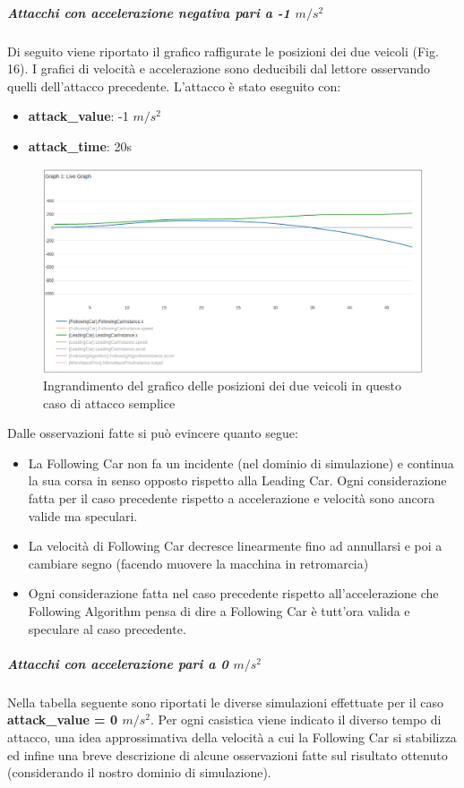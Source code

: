 \subparagraph{Attacchi con accelerazione negativa pari a -1 $m/s^2$}
Di seguito viene riportato il grafico raffigurate le posizioni dei due veicoli (Fig. 16). I grafici di velocità e accelerazione sono deducibili dal lettore osservando quelli dell'attacco precedente.
L'attacco è stato eseguito con:
\begin{itemize}
	\item \textbf{attack\_value}: -1 $m/s^2$
	\item \textbf{attack\_time}: 20s
\end{itemize}
\begin{figure}[H]
	\centering
	\includegraphics[width=\textwidth]{img/AttackAccel-1XZoomed.png}
	\caption{Ingrandimento del grafico delle posizioni dei due veicoli in questo caso di attacco semplice}
\end{figure}

Dalle osservazioni fatte si può evincere quanto segue:
\begin{itemize}
	\item La Following Car non fa un incidente (nel dominio di simulazione) e continua la sua corsa in senso opposto rispetto alla Leading Car. Ogni considerazione fatta per il caso precedente rispetto a accelerazione e velocità sono ancora valide ma speculari.
	\item La velocità di Following Car decresce linearmente fino ad annullarsi e poi a cambiare segno (facendo muovere la macchina in retromarcia)
	\item Ogni considerazione fatta nel caso precedente rispetto all'accelerazione che Following Algorithm pensa di dire a Following  Car è tutt'ora valida e speculare al caso precedente.
\end{itemize}

\subparagraph{Attacchi con accelerazione pari a 0 $m/s^2$}
Nella tabella seguente sono riportati le diverse simulazioni effettuate per il caso \textbf{attack\_value = 0 $m/s^2$}. Per ogni casistica viene indicato il diverso tempo di attacco, una idea approssimativa della velocità a cui la Following Car si stabilizza ed infine una breve descrizione di alcune osservazioni fatte sul risultato ottenuto (considerando il nostro dominio di simulazione).

